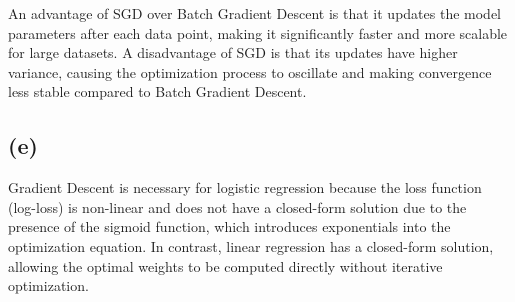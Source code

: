 \documentclass{article}
\begin{document}
An advantage of SGD over Batch Gradient Descent is that it updates the model parameters after each data point, making it significantly faster and more scalable for large datasets. A disadvantage of SGD is that its updates have higher variance, causing the optimization process to oscillate and making convergence less stable compared to Batch Gradient Descent.

\subsection*{(e)}

Gradient Descent is necessary for logistic regression because the loss function (log-loss) is non-linear and does not have a closed-form solution due to the presence of the sigmoid function, which introduces exponentials into the optimization equation. In contrast, linear regression has a closed-form solution, allowing the optimal weights to be computed directly without iterative optimization.
\end{document}
